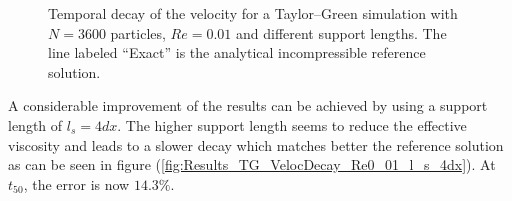 \documentclass[11pt,a4paper,twoside]{report}
\begin{document}
\begin{figure}[h]
\centering
\label{fig:Results_TG_VelocDecay_Re0_01}
\caption[Velocity decay Taylor--Green at $Re=0.01$]{Temporal decay of the velocity for a Taylor--Green simulation with $N=3600$ particles, $Re=0.01$ and different support lengths. The line labeled ``Exact'' is the analytical incompressible reference solution.}
\end{figure}

A considerable improvement of the results can be achieved by using a support length of $l_s=4dx$. The higher support length seems to reduce the effective viscosity and leads to a slower decay which matches better the reference solution as can be seen in figure (\ref{fig:Results_TG_VelocDecay_Re0_01_l_s_4dx}). At $t_{50}$, the error is now $14.3\%$.
\end{document}
